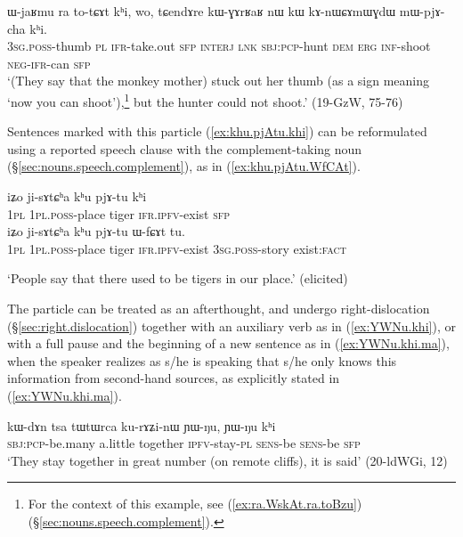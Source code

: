 \begin{exe}
\ex \label{ex:mWpjAcha.khi}
\gll ɯ-jaʁmu ra to-tɕɤt kʰi, wo, tɕendɤre kɯ-ɣɤrʁaʁ nɯ kɯ kɤ-nɯɕɤmɯɣdɯ mɯ-pjɤ-cha kʰi. \\
\textsc{3sg}.\textsc{poss}-thumb \textsc{pl} \textsc{ifr}-take.out \textsc{sfp} \textsc{interj} \textsc{lnk} \textsc{sbj}:\textsc{pcp}-hunt \textsc{dem} \textsc{erg} \textsc{inf}-shoot \textsc{neg}-\textsc{ifr}-can \textsc{sfp} \\
\glt `(They say that the monkey mother) stuck out her thumb (as a sign meaning `now you can shoot'),\footnote{For the context of this example, see (\ref{ex:ra.WskAt.ra.toBzu}) (§\ref{sec:nouns.speech.complement}).} but the hunter could not shoot.' (19-GzW, 75-76)
\end{exe}

Sentences marked with this particle (\ref{ex:khu.pjAtu.khi}) can be reformulated using a reported speech clause with the complement-taking noun   (§\ref{sec:nouns.speech.complement}), as in (\ref{ex:khu.pjAtu.WfCAt}).

\begin{exe}
\ex 
\begin{xlist}
\ex \label{ex:khu.pjAtu.khi}
\gll iʑo ji-sɤtɕʰa kʰu pjɤ-tu kʰi \\
\textsc{1pl} \textsc{1pl}.\textsc{poss}-place tiger \textsc{ifr}.\textsc{ipfv}-exist \textsc{sfp} \\ 
\ex \label{ex:khu.pjAtu.WfCAt}
\gll iʑo ji-sɤtɕʰa kʰu pjɤ-tu ɯ-fɕɤt tu.\\
\textsc{1pl} \textsc{1pl}.\textsc{poss}-place tiger \textsc{ifr}.\textsc{ipfv}-exist \textsc{3sg}.\textsc{poss}-story exist:\textsc{fact} \\
\end{xlist}
\glt `People say that there used to be tigers in our place.' (elicited)
\end{exe}

The particle  can be treated as an afterthought, and undergo right-dislocation (§\ref{sec:right.dislocation}) together with an auxiliary verb as in (\ref{ex:YWNu.khi}), or with a full pause and the beginning of a new sentence as in (\ref{ex:YWNu.khi.ma}), when the speaker realizes as s/he is speaking that s/he only knows this information from second-hand sources, as explicitly stated in (\ref{ex:YWNu.khi.ma}).

\begin{exe}
\ex \label{ex:YWNu.khi}
\gll kɯ-dɤn tsa tɯtɯrca ku-rɤʑi-nɯ ɲɯ-ŋu, ɲɯ-ŋu kʰi  \\
\textsc{sbj}:\textsc{pcp}-be.many a.little together \textsc{ipfv}-stay-\textsc{pl} \textsc{sens}-be \textsc{sens}-be \textsc{sfp} \\
\glt `They stay together in great number (on remote cliffs), it is said' (20-ldWGi, 12)
\end{exe}

